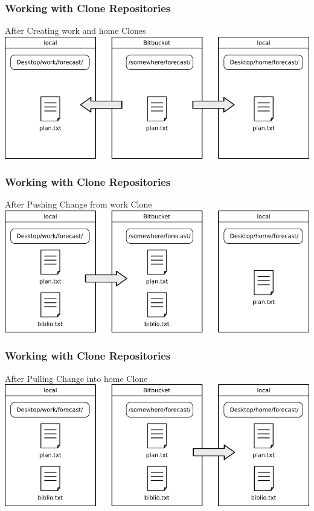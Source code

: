 \documentclass{beamer}
\begin{document}
\begin{frame}
  \frametitle{Working with Clone Repositories}
  \begin{block}{After Creating work and home Clones}
    \includegraphics[scale=0.40]{../fig/hg-after-home-work-clones.png}
  \end{block}
\end{frame}


\begin{frame}
  \frametitle{Working with Clone Repositories}
  \begin{block}{After Pushing Change from work Clone}
    \includegraphics[scale=0.40]{../fig/hg-after-change-to-work-clone.png}
  \end{block}
\end{frame}


\begin{frame}
  \frametitle{Working with Clone Repositories}
  \begin{block}{After Pulling Change into home Clone}
    \includegraphics[scale=0.40]{../fig/hg-after-pulling-to-home-clone.png}
  \end{block}
\end{frame}
\end{document}
